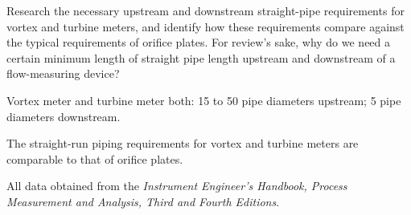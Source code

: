 

Research the necessary upstream and downstream straight-pipe requirements for vortex and turbine meters, and identify how these requirements compare against the typical requirements of orifice plates.  For review's sake, why do we need a certain minimum length of straight pipe length upstream and downstream of a flow-measuring device?







Vortex meter and turbine meter both: 15 to 50 pipe diameters upstream; 5 pipe diameters downstream.







The straight-run piping requirements for vortex and turbine meters are comparable to that of orifice plates.

All data obtained from the {\it Instrument Engineer's Handbook, Process Measurement and Analysis, Third and Fourth Editions}.




